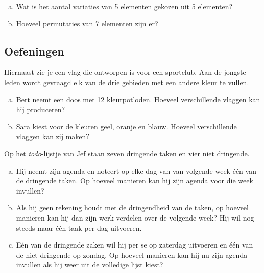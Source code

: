 \documentclass[12pt,a4paper,twoside]{article}
\begin{document}
\begin{oefening}
\begin{enumerate}[(a)]
  \item Wat is het aantal variaties van 5 elementen gekozen uit 5 elementen?
  \item Hoeveel permutaties van 7 elementen zijn er?
\end{enumerate}
\end{oefening}

\subsection{Oefeningen}

\begin{minipage}{0.7\textwidth}
\begin{oefening}
Hiernaast zie je een vlag die ontworpen is voor een sportclub. Aan de jongste leden wordt gevraagd elk van de drie gebieden met een andere kleur te vullen.
\begin{enumerate}[(a)]
  \item Bert neemt een doos met 12 kleurpotloden. Hoeveel verschillende vlaggen kan hij produceren?
  \item Sara kiest voor de kleuren geel, oranje en blauw. Hoeveel verschillende vlaggen kan zij maken?
\end{enumerate}
\end{oefening}
\end{minipage}
\begin{minipage}{0.25\textwidth}
\end{minipage}

\begin{oefening}
Op het {\em todo}-lijstje van Jef staan zeven dringende taken en vier niet dringende.
\begin{enumerate}[(a)]
  \item Hij neemt zijn agenda en noteert op elke dag van van volgende week één van de dringende taken. Op hoeveel manieren kan hij zijn agenda voor die week invullen?
  \item Als hij geen rekening houdt met de dringendheid van de taken, op hoeveel manieren kan hij dan zijn werk verdelen over de volgende week? Hij wil nog steeds maar één taak per dag uitvoeren.
  \item Eén van de dringende zaken wil hij per se op zaterdag uitvoeren en één van de niet dringende op zondag. Op hoeveel manieren kan hij nu zijn agenda invullen als hij weer uit de volledige lijst kiest?
\end{enumerate}
\end{oefening}
\end{document}
